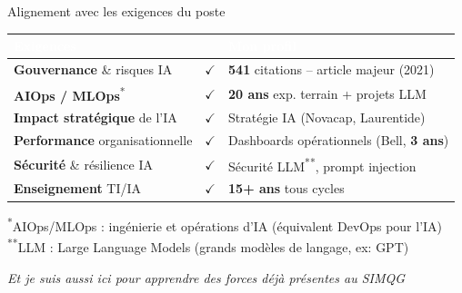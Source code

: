\documentclass[aspectratio=169,11pt]{beamer}
\begin{document}
\begin{frame}{Alignement avec les exigences du poste}
  \small
  \begin{tabular}{>{\raggedright}p{4.2cm}|c|>{\raggedright\arraybackslash}p{6.5cm}}
    \rowcolor{ushervert}
    \textcolor{white}{\textbf{Exigences}} & & \textcolor{white}{\textbf{Mon profil}} \\
    \hline
    \rowcolor{ushervertclair}
    \textbf{Gouvernance} \& risques IA & $\checkmark$ & \textbf{541} citations -- article majeur (2021) \\
    \hline
    \textbf{AIOps / MLOps}\textsuperscript{*} & $\checkmark$ & \textbf{20 ans} exp. terrain + projets LLM \\
    \hline
    \rowcolor{ushervertclair}
    \textbf{Impact stratégique} de l'IA & $\checkmark$ & Stratégie IA (Novacap, Laurentide) \\
    \hline
    \textbf{Performance} organisationnelle & $\checkmark$ & Dashboards opérationnels (Bell, \textbf{3 ans}) \\
    \hline
    \rowcolor{ushervertclair}
    \textbf{Sécurité} \& résilience IA & $\checkmark$ & Sécurité LLM\textsuperscript{**}, prompt injection \\
    \hline
    \textbf{Enseignement} TI/IA & $\checkmark$ & \textbf{15+ ans} tous cycles \\
  \end{tabular}
  
  \vspace{0.2em}
  {\tiny \textsuperscript{*}AIOps/MLOps : ingénierie et opérations d'IA (équivalent DevOps pour l'IA)}\\
  {\tiny \textsuperscript{**}LLM : Large Language Models (grands modèles de langage, ex: GPT)}
  
  \vspace{0.3em}
  \begin{center}
    
    \vspace{0.2em}
    
    {\small\textit{Et je suis aussi ici pour apprendre des forces d\'ej\`a pr\'esentes au SIMQG}}
  \end{center}
\end{frame}
\end{document}
